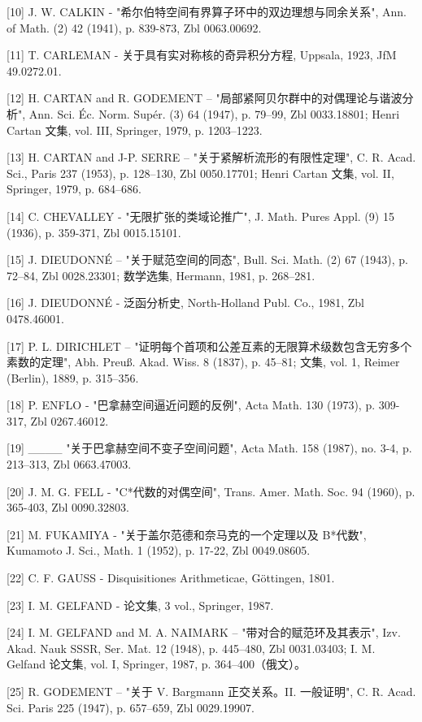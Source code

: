 {[}10{]} J. W. CALKIN - "希尔伯特空间有界算子环中的双边理想与同余关系", Ann. of Math. (2) 42 (1941), p. 839-873, Zbl 0063.00692.

{[}11{]} T. CARLEMAN - 关于具有实对称核的奇异积分方程, Uppsala, 1923, JfM 49.0272.01.

{[}12{]} H. CARTAN and R. GODEMENT -- "局部紧阿贝尔群中的对偶理论与谐波分析", Ann. Sci. Éc. Norm. Supér. (3) 64 (1947), p. 79--99, Zbl 0033.18801; Henri Cartan 文集, vol. III, Springer, 1979, p. 1203--1223.

{[}13{]} H. CARTAN and J-P. SERRE -- "关于紧解析流形的有限性定理", C. R. Acad. Sci., Paris 237 (1953), p. 128--130, Zbl 0050.17701; Henri Cartan 文集, vol. II, Springer, 1979, p. 684--686.

{[}14{]} C. CHEVALLEY - "无限扩张的类域论推广", J. Math. Pures Appl. (9) 15 (1936), p. 359-371, Zbl 0015.15101.

{[}15{]} J. DIEUDONNÉ -- "关于赋范空间的同态", Bull. Sci. Math. (2) 67 (1943), p. 72--84, Zbl 0028.23301; 数学选集, Hermann, 1981, p. 268--281.

{[}16{]} J. DIEUDONNÉ - 泛函分析史, North-Holland Publ. Co., 1981, Zbl 0478.46001.

{[}17{]} P. L. DIRICHLET -- "证明每个首项和公差互素的无限算术级数包含无穷多个素数的定理", Abh. Preuß. Akad. Wiss. 8 (1837), p. 45--81; 文集, vol. 1, Reimer (Berlin), 1889, p. 315--356.

{[}18{]} P. ENFLO - "巴拿赫空间逼近问题的反例", Acta Math. 130 (1973), p. 309-317, Zbl 0267.46012.

{[}19{]} \_\_\_\_ "关于巴拿赫空间不变子空间问题", Acta Math. 158 (1987), no. 3-4, p. 213--313, Zbl 0663.47003.

{[}20{]} J. M. G. FELL - "C*代数的对偶空间", Trans. Amer. Math. Soc. 94 (1960), p. 365-403, Zbl 0090.32803.

{[}21{]} M. FUKAMIYA - "关于盖尔范德和奈马克的一个定理以及 B*代数", Kumamoto J. Sci., Math. 1 (1952), p. 17-22, Zbl 0049.08605.

{[}22{]} C. F. GAUSS - Disquisitiones Arithmeticae, Göttingen, 1801.

{[}23{]} I. M. GELFAND - 论文集, 3 vol., Springer, 1987.

{[}24{]} I. M. GELFAND and M. A. NAIMARK -- "带对合的赋范环及其表示", Izv. Akad. Nauk SSSR, Ser. Mat. 12 (1948), p. 445--480, Zbl 0031.03403; I. M. Gelfand 论文集, vol. I, Springer, 1987, p. 364--400（俄文）。

{[}25{]} R. GODEMENT -- "关于 V. Bargmann 正交关系。II. 一般证明", C. R. Acad. Sci. Paris 225 (1947), p. 657--659, Zbl 0029.19907.

